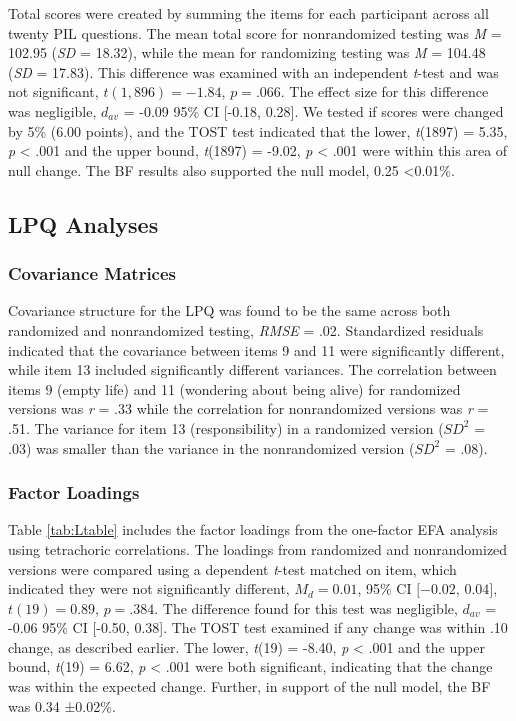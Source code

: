 \documentclass[english,man, mask]{apa6}
\theoremstyle{definition}
\theoremstyle{definition}
\theoremstyle{definition}
\theoremstyle{remark}
\begin{document}
Total scores were created by summing the items for each participant
across all twenty PIL questions. The mean total score for nonrandomized
testing was \emph{M} = 102.95 (\emph{SD} = 18.32), while the mean for
randomizing testing was \emph{M} = 104.48 (\emph{SD} = 17.83). This
difference was examined with an independent \emph{t}-test and was not
significant, \(t(1,896) = -1.84\), \(p = .066\). The effect size for
this difference was negligible, \(d_{av}\) = -0.09 95\% CI {[}-0.18,
0.28{]}. We tested if scores were changed by 5\% (6.00 points), and the
TOST test indicated that the lower, \emph{t}(1897) = 5.35, \emph{p}
\textless{} .001 and the upper bound, \emph{t}(1897) = -9.02, \emph{p}
\textless{} .001 were within this area of null change. The BF results
also supported the null model, 0.25 \textless{}0.01\%.

\subsection{LPQ Analyses}\label{lpq-analyses}

\subsubsection{Covariance Matrices}\label{covariance-matrices-1}

Covariance structure for the LPQ was found to be the same across both
randomized and nonrandomized testing, \emph{RMSE} = .02. Standardized
residuals indicated that the covariance between items 9 and 11 were
significantly different, while item 13 included significantly different
variances. The correlation between items 9 (empty life) and 11
(wondering about being alive) for randomized versions was \emph{r} = .33
while the correlation for nonrandomized versions was \emph{r} = .51. The
variance for item 13 (responsibility) in a randomized version (\(SD^2\)
= .03) was smaller than the variance in the nonrandomized version
(\(SD^2\) = .08).

\subsubsection{Factor Loadings}\label{factor-loadings-1}

Table \ref{tab:Ltable} includes the factor loadings from the one-factor
EFA analysis using tetrachoric correlations. The loadings from
randomized and nonrandomized versions were compared using a dependent
\emph{t}-test matched on item, which indicated they were not
significantly different, \(M_d = 0.01\), 95\% CI \([-0.02\), \(0.04]\),
\(t(19) = 0.89\), \(p = .384\). The difference found for this test was
negligible, \(d_{av}\) = -0.06 95\% CI {[}-0.50, 0.38{]}. The TOST test
examined if any change was within .10 change, as described earlier. The
lower, \emph{t}(19) = -8.40, \emph{p} \textless{} .001 and the upper
bound, \emph{t}(19) = 6.62, \emph{p} \textless{} .001 were both
significant, indicating that the change was within the expected change.
Further, in support of the null model, the BF was 0.34 ±0.02\%.
\end{document}
